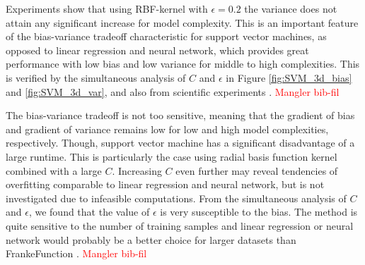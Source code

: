 \documentclass[a4paper]{article}
\begin{document}
	Experiments show that using RBF-kernel with $\epsilon=0.2$ the variance does not attain any significant increase for model complexity. This is an important feature of the bias-variance tradeoff characteristic for support vector machines, as opposed to linear regression and neural network, which provides great performance with low bias and low variance for middle to high complexities. This is verified by the simultaneous analysis of $C$ and $\epsilon$ in Figure \ref{fig:SVM_3d_bias} and \ref{fig:SVM_3d_var}, and also from scientific experiments \cite{valentini2004bias}.
	\textcolor{red}{Mangler bib-fil}
	
	The bias-variance tradeoff is not too sensitive, meaning that the gradient of bias and gradient of variance remains low for low and high model complexities, respectively. Though, support vector machine has a significant disadvantage of a large runtime. This is particularly the case using radial basis function kernel combined with a large $C$. Increasing $C$ even further may reveal tendencies of overfitting comparable to linear regression and neural network, but is not investigated due to infeasible computations. From the simultaneous analysis of $C$ and $\epsilon$, we found that the value of $\epsilon$ is very susceptible to the bias. The method is quite sensitive to the number of training samples and linear regression or neural network would probably be a better choice for larger datasets than FrankeFunction \cite{valentini2004bias}.
	\textcolor{red}{Mangler bib-fil}
	
	
	
	


\end{document}
